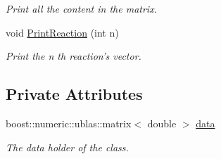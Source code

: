 \begin{CompactItemize}
\begin{CompactList}\small\item\em Print all the content in the matrix. \item\end{CompactList}\item 
\hypertarget{class_stoichiometry_matrix_1bf09975ed232cea903a82ae29d36914}{
void \hyperlink{class_stoichiometry_matrix_1bf09975ed232cea903a82ae29d36914}{PrintReaction} (int n)}
\label{class_stoichiometry_matrix_1bf09975ed232cea903a82ae29d36914}

\begin{CompactList}\small\item\em Print the n th reaction's vector. \item\end{CompactList}\end{CompactItemize}
\subsection*{Private Attributes}
\begin{CompactItemize}
\item 
boost::numeric::ublas::matrix$<$ double $>$ \hyperlink{class_stoichiometry_matrix_26e7f2350a2b33fa2c02db5b5098a4f0}{data}
\begin{CompactList}\small\item\em The data holder of the class. \item\end{CompactList}\end{CompactItemize}
